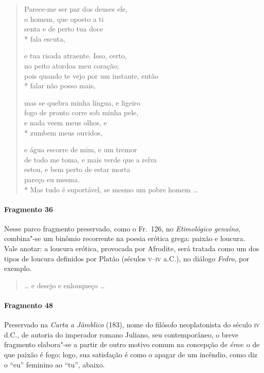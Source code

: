 \begin{verse}
Parece-me ser par dos deuses ele,\\
o homem, que oposto a ti\\
senta e de perto tua doce\\*
fala escuta,

e tua risada atraente. Isso, certo,\\
no peito atordoa meu coração;\\
pois quando te vejo por um instante, então\\*
falar não posso mais,

mas se quebra minha língua, e ligeiro\\
fogo de pronto corre sob minha pele,\\
e nada veem meus olhos, e\\*
zumbem meus ouvidos,

e água escorre de mim, e um tremor\\
de todo me toma, e mais verde que a relva\\
estou, e bem perto de estar morta\\
pareço eu mesma.\\*
Mas tudo é suportável, se mesmo um pobre \qb{}homem \ldots{}
\end{verse}

\paragraph{Fragmento 36}

{\small Nesse parco fragmento preservado, como o Fr.~126, no \textit{Etimológico genuíno}, combina"-se um binômio recorrente na poesia erótica grega:
paixão e loucura. Vale anotar: a loucura erótica, provocada por Afrodite, será
tratada como um dos tipos de loucura definidos por Platão (séculos \textsc{v}--\textsc{iv} a.C.),
no diálogo \textit{Fedro}, por exemplo.}

\begin{verse}
\ldots{} e desejo e enlouqueço \ldots{}
\end{verse}


\paragraph{Fragmento 48}

{\small Preservado na \textit{Carta a Jâmblico} (183), nome do filósofo neoplatonista do
século \textsc{iv} d.C., de autoria do imperador romano Juliano, seu contemporâneo, o
breve fragmento elabora"-se a partir de outro motivo comum na concepção de
\textit{éros}: o de que paixão é fogo; logo, sua satisfação é como o apagar de
um incêndio, como diz o “eu” feminino ao “tu”, abaixo.}

